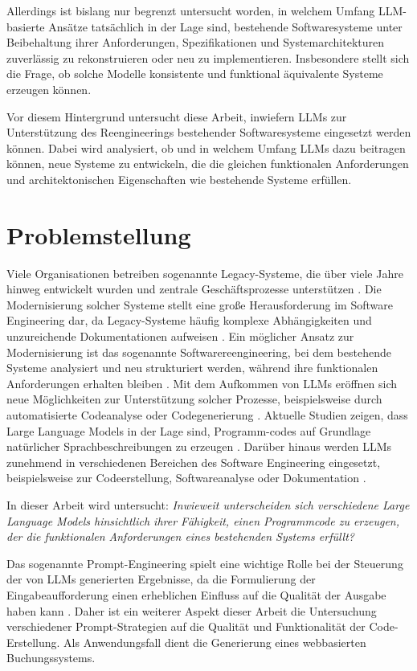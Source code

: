 Allerdings ist bislang nur begrenzt untersucht worden, in welchem Umfang LLM-basierte Ansätze tatsächlich in der Lage sind, bestehende Softwaresysteme unter Beibehaltung ihrer Anforderungen, Spezifikationen und Systemarchitekturen zuverlässig zu rekonstruieren oder neu zu implementieren. Insbesondere stellt sich die Frage, ob solche Modelle konsistente und funktional äquivalente Systeme erzeugen können.

Vor diesem Hintergrund untersucht diese Arbeit, inwiefern LLMs zur Unterstützung des Reengineerings bestehender Softwaresysteme eingesetzt werden können. Dabei wird analysiert, ob und in welchem Umfang LLMs dazu beitragen können, neue Systeme zu entwickeln, die die gleichen funktionalen Anforderungen und architektonischen Eigenschaften wie bestehende Systeme erfüllen.
\section{Problemstellung}
Viele Organisationen betreiben sogenannte Legacy-Systeme, die über viele Jahre hinweg entwickelt wurden und zentrale Geschäftsprozesse unterstützen \cite{sommerville2016software}. 
Die Modernisierung solcher Systeme stellt eine große Herausforderung 
im Software Engineering dar, da Legacy-Systeme häufig komplexe 
Abhängigkeiten und unzureichende Dokumentationen aufweisen 
\cite{seacord2003modernizing}. 
Ein möglicher Ansatz zur Modernisierung ist das sogenannte 
Softwarereengineering, bei dem bestehende Systeme analysiert 
und neu strukturiert werden, während ihre funktionalen 
Anforderungen erhalten bleiben \cite{chikofsky1990reverse}. 
Mit dem Aufkommen von LLMs eröffnen sich neue 
Möglichkeiten zur Unterstützung solcher Prozesse, beispielsweise 
durch automatisierte Codeanalyse oder Codegenerierung 
\cite{fan2023largelanguagemodelssoftware}.
Aktuelle Studien zeigen, dass Large Language Models in der Lage sind, Programm-codes auf Grundlage natürlicher Sprachbeschreibungen zu erzeugen \cite{chen2021evaluatinglargelanguagemodels}. Darüber hinaus werden LLMs zunehmend in verschiedenen Bereichen des Software Engineering eingesetzt,  beispielsweise zur Codeerstellung, Softwareanalyse oder Dokumentation \cite{LLMinSEreviewandvision}.

In dieser Arbeit wird untersucht: 
\textit{Inwieweit unterscheiden sich verschiedene Large Language 
Models hinsichtlich ihrer Fähigkeit, einen Programmcode zu erzeugen, 
der die funktionalen Anforderungen eines bestehenden Systems erfüllt?}


Das sogenannte Prompt-Engineering spielt eine wichtige Rolle bei der Steuerung der von LLMs generierten Ergebnisse, da die Formulierung der Eingabeaufforderung einen erheblichen Einfluss auf die Qualität der Ausgabe haben kann \cite{reynolds2021promptprogramminglargelanguage}.
Daher ist ein weiterer Aspekt dieser Arbeit die Untersuchung verschiedener Prompt-Strategien auf die Qualität und Funktionalität der Code-Erstellung. Als Anwendungsfall dient die Generierung eines webbasierten Buchungssystems.
